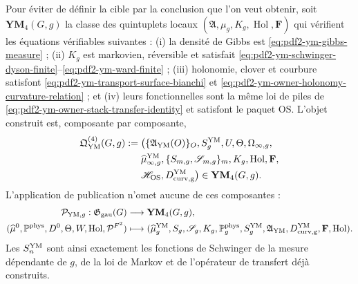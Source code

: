 Pour éviter de définir la cible par la conclusion que l’on veut obtenir, soit
$\mathbf{YM}_4(G,g)$ la classe des quintuplets locaux
$(\mathfrak A,\mu_g,K_g,\operatorname{Hol},\mathbf F)$ qui vérifient les
équations vérifiables suivantes : (i) la densité de Gibbs est
\eqref{eq:pdf2-ym-gibbs-measure} ; (ii) $K_g$ est markovien, réversible et satisfait
\eqref{eq:pdf2-ym-schwinger-dyson-finite}--\eqref{eq:pdf2-ym-ward-finite} ;
(iii) holonomie, clover et courbure satisfont
\eqref{eq:pdf2-ym-transport-surface-bianchi} et
\eqref{eq:pdf2-ym-owner-holonomy-curvature-relation} ; et (iv) leurs fonctionnelles sont la
même loi de piles de \eqref{eq:pdf2-ym-owner-stack-transfer-identity} et satisfont le
paquet OS\@. L’objet construit est, composante par composante,
\begin{equation}\label{eq:pdf2-ym-owner-qym-object}
\begin{aligned}
 \mathfrak Q_{\rm YM}^{(4)}(G,g):={}&
 \bigl(\{\mathfrak A_{\rm YM}(O)\}_O,
 S_g^{\rm YM},U,\Theta,\Omega_{\infty,g},\\
 &\widehat\mu_{\infty,g}^{\rm YM},
 \{S_{m,g},\mathscr S_{m,g}\}_m,K_g,
 \operatorname{Hol},\mathbf F,\\
 &\mathscr H_{\rm OS},D_{\rm curv,g}^{\rm YM}\bigr)
 \in\mathbf{YM}_4(G,g).
\end{aligned}
\end{equation}
L’application de publication n’omet aucune de ces composantes :
\begin{equation}\label{eq:pdf2-ym-owner-typed-publication-map}
 \begin{aligned}
 \mathcal P_{{\rm YM},g}:\mathfrak G_{\rm gau}(G)&\longrightarrow
 \mathbf{YM}_4(G,g),\\
 (\widehat\mu^0,\mathbb P^{\rm phys},D^0,\Theta,W,
   \operatorname{Hol},\mathcal P^{F^2})
 &\longmapsto
 (\widehat\mu_g^{\rm YM},S_g,\mathscr S_g,K_g,\mathbb P_g^{\rm phys},
  S_g^{\rm YM},\mathfrak A_{\rm YM},D_{\rm curv,g}^{\rm YM},
  \mathbf F,\operatorname{Hol}).
 \end{aligned}
\end{equation}
Les $S_n^{\rm YM}$ sont ainsi exactement les fonctions de Schwinger de la mesure dépendante de $g$, de la loi de Markov et de l'opérateur de transfert déjà construits.

